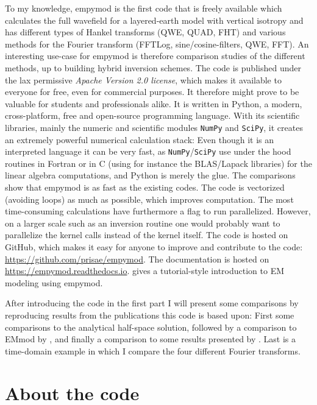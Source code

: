 \documentclass[manuscript,revised]{geophysics}
\begin{document}
To my knowledge, empymod is the first code that is freely available which
calculates the full wavefield for a layered-earth model with vertical isotropy
and has different types of Hankel transforms (QWE, QUAD, FHT) and various
methods for the Fourier transform (FFTLog, sine/cosine-filters, QWE, FFT). An
interesting use-case for empymod is therefore comparison studies of the
different methods, up to building hybrid inversion schemes. The code is
published under the lax permissive \emph{Apache Version 2.0 license}, which
makes it available to everyone for free, even for commercial purposes. It
therefore might prove to be valuable for students and professionals alike. It
is written in Python, a modern, cross-platform, free and open-source
programming language. With its scientific libraries, mainly the numeric and
scientific modules \texttt{NumPy} and \texttt{SciPy}, it creates an extremely
powerful numerical calculation stack: Even though it is an interpreted language
it can be very fast, as \texttt{NumPy}/\texttt{SciPy} use under the hood
routines in Fortran or in C (using for instance the BLAS/Lapack libraries) for
the linear algebra computations, and Python is merely the glue. The comparisons
show that empymod is as fast as the existing codes. The code is vectorized
(avoiding loops) as much as possible, which improves computation. The most
time-consuming calculations have furthermore a flag to run parallelized.
However, on a larger scale such as an inversion routine one would probably want
to parallelize the kernel calls instead of the kernel itself. The code is
hosted on GitHub, which makes it easy for anyone to improve and contribute to
the code: \url{https://github.com/prisae/empymod}. The documentation is hosted
on \url{https://empymod.readthedocs.io}. \cite{TLE.17.Werthmuller} gives a
tutorial-style introduction to EM modeling using empymod.

After introducing the code in the first part I will present some comparisons by
reproducing results from the publications this code is based upon: First some
comparisons to the analytical half-space solution, followed by a comparison to
EMmod by \cite{GEO.15.Hunziker}, and finally a comparison to some results
presented by \cite{GEO.12.Key}. Last is a time-domain example in which I
compare the four different Fourier transforms.


\section{About the code}
\end{document}
